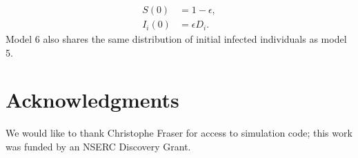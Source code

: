 \documentclass[10pt,letterpaper]{article}
\begin{document}
\begin{equation}
\begin{aligned}
S(0) &= 1 - \epsilon,\\
I_i(0) &=  \epsilon D_i.
\end{aligned}
\end{equation}
Model 6 also shares the same distribution of initial infected individuals as model 5.

\section*{Acknowledgments}
We would like to thank Christophe Fraser for access to simulation code;
this work was funded by an NSERC Discovery Grant.

\nolinenumbers

%
%
% 


\end{document}
